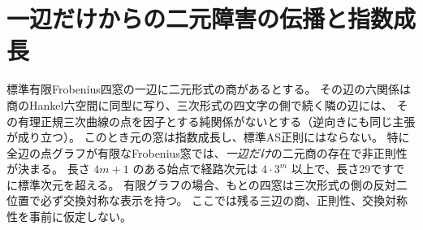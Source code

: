 \section{一辺だけからの二元障害の伝播と指数成長}
\label{sec:single-binary-edge-obstruction}
\begin{theorem}\label{thm:single-binary-edge-obstruction}
標準有限Frobenius四窓の一辺に二元形式の商があるとする。
その辺の六関係は商のHankel六空間に同型に写り、三次形式の四文字の側で続く隣の辺には、
その有理正規三次曲線の点を因子とする純関係がないとする（逆向きにも同じ主張が成り立つ）。
このとき元の窓は指数成長し、標準AS正則にはならない。
特に全辺の点グラフが有限なFrobenius窓では、\emph{一辺だけ}の二元商の存在で非正則性が決まる。
長さ $4m+1$ のある始点で経路次元は $4\cdot3^m$ 以上で、長さ29ですでに標準次元を超える。
有限グラフの場合、もとの四窓は三次形式の側の反対二位置で必ず交換対称な表示を持つ。
ここでは残る三辺の商、正則性、交換対称性を事前に仮定しない。
\end{theorem}
